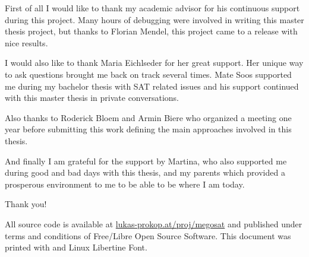 \documentclass[11pt,a4paper,final,openright]{book}
\theoremstyle{definition}
\begin{document}
\begin{acknowledgements}%
  \parskip5pt
  First of all I would like to thank my academic advisor for his continuous support
  during this project. Many hours of debugging were involved in writing this
  master thesis project, but thanks to Florian Mendel, this project came to a release
  with nice results.

  I would also like to thank Maria Eichlseder for her great support. Her unique
  way to ask questions brought me back on track several times.
  Mate Soos supported me during my bachelor thesis with SAT related issues
  and his support continued with this master thesis in private conversations.

  Also thanks to Roderick Bloem and Armin Biere who organized a meeting
  one year before submitting this work defining the main approaches involved
  in this thesis.

  And finally I am grateful for the support by Martina,
  who also supported me during good and bad days with this thesis,
  and my parents which provided a prosperous environment to me
  to be able to be where I am today.

  Thank you!
\end{acknowledgements}

All source code is available at \href{http://lukas-prokop.at/proj/megosat}{lukas-prokop.at/proj/megosat}
and published under terms and conditions of Free/Libre Open Source Software.
This document was printed with \LuaLaTeX and Linux Libertine Font.


\listoffigures
\listoftables
\tableofcontents
\mainmatter






\end{document}
